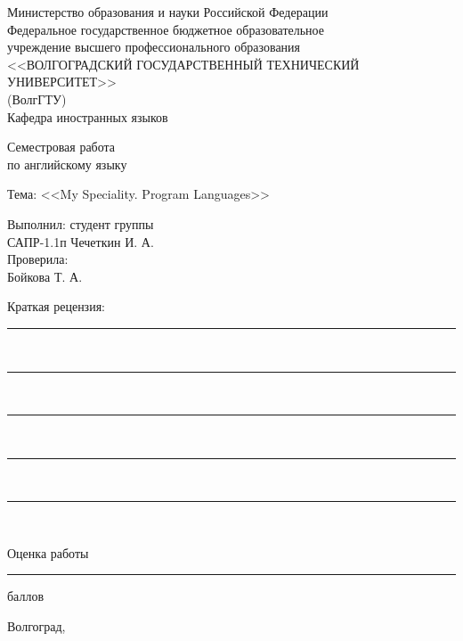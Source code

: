 \begin{titlepage}
  \begin{center}
    Министерство образования и науки Российской Федерации \\
    Федеральное государственное бюджетное образовательное \\
    учреждение высшего профессионального образования \\
    <<ВОЛГОГРАДСКИЙ ГОСУДАРСТВЕННЫЙ ТЕХНИЧЕСКИЙ УНИВЕРСИТЕТ>> \\
    (ВолгГТУ) \\
    Кафедра иностранных языков
  \end{center}
  \vspace{7em}
  \begin{center}
    {\large Семестровая работа}\\
    по английскому языку
  \end{center}
  \begin{center}
    Тема: <<My Speciality. Program Languages>>
  \end{center}
  \vspace{2em}

  \begin{flushright}
    \begin{minipage}{.40\textwidth}
      Выполнил: студент группы \\
      САПР-1.1п Чечеткин И. А. \\[.25em]
      
      Проверила: \\
      Бойкова Т. А.
    \end{minipage}
  \end{flushright}
  \vspace{1em}
  Краткая рецензия:\hspace{1ex}\rule{25.4em}{.25pt}\\
  \hrule~\\\hrule~\\\hrule~\\\hrule~\\
  \begin{center}
    Оценка работы \rule{7.5em}{.5pt} баллов
  \end{center}
  
  \vfill  
  \begin{center}
    Волгоград, \the\year
  \end{center}
\end{titlepage}
